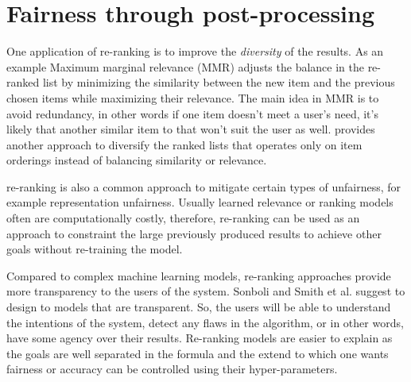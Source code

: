 \chapter{Fairness through post-processing}
\label{ch:fairness_postproc}

One application of re-ranking is to improve the \textit{diversity} of the results. As an example Maximum marginal relevance (MMR) adjusts the balance in the re-ranked list by minimizing the similarity between the new item and the previous chosen items \cite{carbonell1998use} while maximizing their relevance. The main idea in MMR is to avoid redundancy, in other words if one item doesn't meet a user's need, it's likely that another similar item to that won't suit the user as well. \cite{Ziegler:2005:IRL:1060745.1060754} provides another approach to diversify the ranked lists that operates only on item orderings instead of balancing similarity or relevance. 

re-ranking is also a common approach to mitigate certain types of unfairness, for example representation unfairness. Usually learned relevance or ranking models often are computationally costly, therefore, re-ranking can be used as an approach to constraint the large previously produced results to achieve other goals without re-training the model.

Compared to complex machine learning models, re-ranking approaches provide more transparency to the users of the system. Sonboli and Smith et al. \cite{Sonboli2021transparency} suggest to design to models that are transparent. So, the users will be able to understand the intentions of the system, detect any flaws in the algorithm, or in other words, have some agency over their results. Re-ranking models are easier to explain as the goals are well separated in the formula and the extend to which one wants fairness or accuracy can be controlled using their hyper-parameters. 



